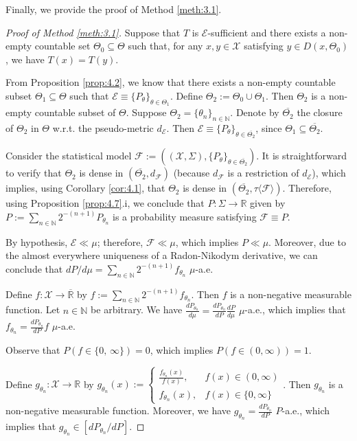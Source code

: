\documentclass[12pt]{article}
\begin{document}
Finally, we provide the proof of Method \ref{meth:3.1}.

\begin{proof}[Proof of Method \ref{meth:3.1}]
Suppose that $T$ is $\mathcal{E}$-sufficient and there exists a non-empty countable set $\Theta _0\subseteq\Theta$ such that, for any $x,y\in\mathcal{X}$ satisfying $y\in D(x,\Theta _0)$, we have $T(x)=T(y)$.

From Proposition \ref{prop:4.2}, we know that there exists a non-empty countable subset $\Theta _{1}\subseteq \Theta$ such that $\mathcal{E}\equiv \{P_\theta \}_{\theta\in\Theta _{1}}$. Define $\Theta _2:=\Theta _0\cup \Theta _{1}$. Then $\Theta _2$ is a non-empty countable subset of $\Theta$. Suppose $\Theta _2=\{\theta _n\}_{n\in\mathbb{N}}$. Denote by $\overline{\Theta _2}$ the closure of $\Theta _2$ in $\Theta$ w.r.t. the pseudo-metric $d_\mathcal{E}$. Then $\mathcal{E}\equiv \{P_\theta \}_{\theta\in\overline{\Theta _2}}$, since $\Theta _1\subseteq\overline{\Theta _2}$.

Consider the statistical model $\mathcal{F}:=((\mathcal{X},\Sigma ),\{P_\theta\}_{\theta\in\overline{\Theta_2}})$. It is straightforward to verify that $\Theta _2$ is dense in $(\overline{\Theta _2},d_\mathcal{F})$ (because $d_\mathcal{F}$ is a restriction of $d_\mathcal{E}$), which implies, using Corollary \ref{cor:4.1}, that $\Theta _2$ is dense in $(\overline{\Theta _2},\tau \langle \mathcal{F}\rangle )$. Therefore, using Proposition \ref{prop:4.7}.i, we conclude that $P:\Sigma\to\mathbb{R}$ given by $P:=\sum _{n\in\mathbb{N}}2^{-(n+1)}P_{\theta _n}$ is a probability measure satisfying $\mathcal{F}\equiv P$.

By hypothesis, $\mathcal{E}\ll \mu$; therefore, $\mathcal{F}\ll \mu $, which implies $P\ll \mu $. Moreover, due to the almost everywhere uniqueness of a Radon-Nikodym derivative, we can conclude that  $dP/d\mu =\sum _{n\in\mathbb{N} }2^{-(n+1)}f_{\theta _n} $ $\mu$-a.e.

Define $f:\mathcal{X}\to \overline{\mathbb{R}}$ by $f:=\sum _{n\in\mathbb{N}}2^{-(n+1)}f_{\theta _n}$. Then $f$ is a non-negative measurable function. Let $n\in\mathbb{N}$ be arbitrary. We have $\frac{dP_{\theta_n}}{d\mu }=\frac{dP_{\theta _n}}{dP}\frac{dP}{d\mu }$ $\mu$-a.e., which implies that $f_{\theta _n}=\frac{dP_{\theta _n}}{dP}f$ $\mu$-a.e.

Observe that $P(f\in \{0,\,\infty \})=0$, which implies $P(f\in (0,\infty ))=1$.

Define $g_{\theta _n}:\mathcal{X}\to \mathbb{R}$ by $g_{\theta _n}(x):=\begin{cases}\frac{f_{\theta _n}(x)}{f(x)},&f(x)\in (0,\infty )\\f_{\theta _n}(x),&f(x)\in\{0,\infty \}\end{cases}$. Then $g_{\theta _n}$ is a non-negative measurable function. Moreover, we have $g_{\theta _n}=\frac{dP_{\theta _n}}{dP}$ $P$-a.e., which implies that $g_{\theta _n}\in [dP_{\theta _n}/dP]$.


\end{proof}
\end{document}
